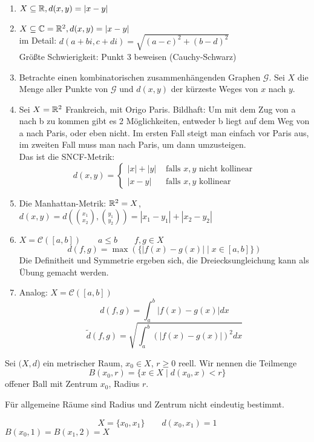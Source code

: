 \documentclass[main.tex]{subfiles}
\begin{document}
\begin{Beispiel}
  \begin{enumerate}
    \item $X \subseteq \mathbb{R}, d(x,y) = |x-y|$
    \item $X \subseteq \mathbb{C} = \mathbb{R}^2, d(x,y) = |x-y|$\\
      im Detail: $d(a + bi, c+di) = \sqrt{(a-c)^2+(b-d)^2}$\\
      Größte Schwierigkeit: Punkt 3 beweisen (Cauchy-Schwarz)
    \item Betrachte einen kombinatorischen zusammenhängenden Graphen $\mathcal{G}$. Sei $X$ die Menge aller Punkte von $\mathcal{G}$ und $d(x,y)$ der kürzeste Weges von $x$ nach $y$.
    \item Sei $X= \mathbb{R}^2$ Frankreich, mit Origo Paris. Bildhaft: Um mit dem Zug von a nach b zu kommen gibt es 2 Möglichkeiten, entweder b liegt auf dem Weg von a nach Paris, oder eben nicht. Im ersten Fall steigt man einfach vor Paris aus, im zweiten Fall muss man nach Paris, um dann umzusteigen.\\
      Das ist die SNCF-Metrik:
      $$d(x,y)=\left\{\begin{aligned}
        |x| + |y| & \text{ falls $x,y$ nicht kollinear}\\
        |x - y| & \text{ falls $x,y$ kollinear}
      \end{aligned}\right.$$
    \item Die Manhattan-Metrik: $\mathbb{R}^2 = X$, $d(x,y) = d({x_1 \choose x_2},{y_1 \choose y_2}) = |x_1 -y_1| + |x_2 - y_2|$
    \item $X = \mathcal{C}([a,b]) \qquad a \leq b \qquad f,g \in X$
      $$d(f,g) = \max(\{|f(x)-g(x)| \mid x \in [a,b]\})$$
      Die Definitheit und Symmetrie ergeben sich, die Dreiecksungleichung kann als Übung gemacht werden.
    \item Analog: $X = \mathcal{C}([a,b])$
      $$d(f,g) = \int_a^b |f(x)-g(x)| dx $$
      $$\tilde{d}(f,g) = \sqrt{\int_a^b (|f(x)-g(x)|)^2 dx }$$
  \end{enumerate}
\end{Beispiel}

\begin{Definition}[Ball]
  Sei $(X,d$) ein metrischer Raum, $x_0 \in X$, $r\geq 0$ reell. Wir nennen die Teilmenge
  $$B(x_0,r) = \{x \in X \mid d(x_0,x) < r \}$$
  offener Ball mit Zentrum $x_0$, Radius $r$.
\end{Definition}

\begin{Bemerkung}
  Für allgemeine Räume sind Radius und Zentrum nicht eindeutig bestimmt.
  \begin{Beispiel}
    $$X = \{x_0,x_1\} \qquad d(x_0,x_1) = 1$$
    $B(x_0,1) = B(x_1,2) = X$
  \end{Beispiel}
\end{Bemerkung}
\end{document}
